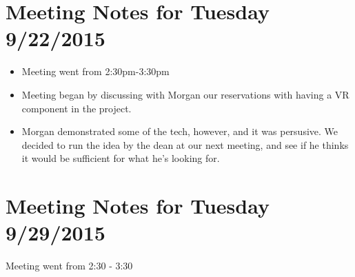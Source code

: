 \documentclass[]{article}
\begin{document}
\section{Meeting Notes for Tuesday 9/22/2015}
	\begin{itemize}
		\item Meeting went from 2:30pm-3:30pm
	\end{itemize}
	\begin{itemize}
		\item Meeting began by discussing with Morgan our reservations with having a VR component in the project. 
		\item Morgan demonstrated some of the tech, however, and it was persusive. We decided to run the idea by 
		the dean at our next meeting, and see if he thinks it would be sufficient for what he's looking for. 
	\end{itemize}
	
\section{Meeting Notes for Tuesday 9/29/2015}
	\begin{itemize}
		Meeting went  from 2:30 - 3:30
	\end{itemize}
		
\end{document}
